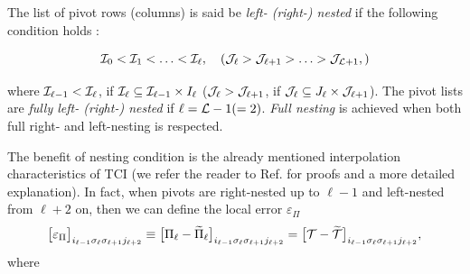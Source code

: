 The list of pivot rows (columns) is said be \textit{left- (right-) nested} if the following condition holds \cite{Oseledets2011, Dolgov2020}:

\begin{equation}
	\label{eq:Nesting}
	\mathcal{I}_0 <  \mathcal{I}_1  < \ldots < \mathcal{I}_{\ell} ,\quad (\mathcal{J}_{\ell} > \mathcal{J}_{\ell+1} > \ldots > \mathcal{J}_{\mathcal{L}+1} ,)
\end{equation}

where $\mathcal{I}_{\ell -1 } <\mathcal{I}_\ell$,  if
$\mathcal{I}_\ell \subseteq \mathcal{I}_{\ell -1 } \times 
I_\ell $ ($\mathcal{J}_{\ell} > \mathcal{J}_{\ell +1}$,  if
$\mathcal{J}_\ell \subseteq J_\ell \times \mathcal{J}_{\ell + 1 }$). The pivot lists are \textit{fully left- (right-) nested} if $\ell = \mathcal{L} - 1 (=2)$. \textit{Full nesting} is achieved when both full right- and left-nesting is respected.

The benefit of nesting condition is the already mentioned interpolation characteristics of TCI (we refer the reader to Ref. \cite{Fernandez2022, Fernandez2024} for proofs and a more detailed explanation). In fact, when pivots are right-nested up to $\ell -1$ and left-nested from $\ell +2$ on, then we can define the local error $\varepsilon_\Pi$ 
\begin{equation}
	\label{eq:ErrorPiIsErrorT}
	\bigl[\varepsilon_\Pi\bigr]_{i_{\ell-1}\sigma_\ell \sigma_{\ell +1} j_{\ell +2 }} \equiv \bigl[ \Pi_\ell - \widetilde{\Pi}_\ell\bigr]_{i_{\ell-1}\sigma_\ell \sigma_{\ell +1} j_{\ell +2 }} 
	= 
   \bigl[ \mathcal{T}-\widetilde{\mathcal{T}}\bigr]_{i_{\ell-1}\sigma_\ell \sigma_{\ell +1} j_{\ell+2}},
 \end{equation}
where 

